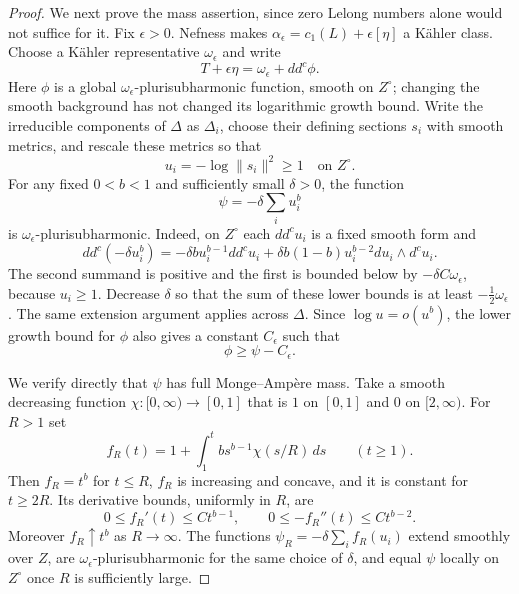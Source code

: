 \begin{proof}
We next prove the mass assertion, since zero Lelong numbers alone would
not suffice for it.  Fix $\epsilon>0$.  Nefness makes
$\alpha_\epsilon=c_1(L)+\epsilon[\eta]$ a Kähler class.  Choose a Kähler
representative $\omega_\epsilon$ and write
\[
 T+\epsilon\eta=\omega_\epsilon+dd^c\phi.
\]
Here $\phi$ is a global $\omega_\epsilon$-plurisubharmonic function,
smooth on $Z^\circ$; changing the smooth background has not changed its
logarithmic growth bound.  Write the irreducible components of $\Delta$
as $\Delta_i$, choose their defining sections $s_i$ with smooth metrics,
and rescale these metrics so that
\[
 u_i=-\log\|s_i\|^2\geq1\quad\text{on }Z^\circ.
\]
For any fixed $0<b<1$ and sufficiently small $\delta>0$, the function
\begin{equation}\label{eq:prelim-mass-barrier}
 \psi=-\delta\sum_i u_i^b
\end{equation}
is $\omega_\epsilon$-plurisubharmonic.  Indeed, on $Z^\circ$ each
$dd^c u_i$ is a fixed smooth form and
\[
 dd^c(-\delta u_i^b)
   =-\delta b u_i^{b-1}dd^c u_i
     +\delta b(1-b)u_i^{b-2}du_i\wedge d^c u_i.
\]
The second summand is positive and the first is bounded below by
$-\delta C\omega_\epsilon$, because $u_i\geq1$.  Decrease $\delta$ so
that the sum of these lower bounds is at least
$-\tfrac12\omega_\epsilon$.  The same extension argument applies across
$\Delta$.  Since $\log u=o(u^b)$, the lower growth bound for $\phi$
also gives a constant $C_\epsilon$ such that
\begin{equation}\label{eq:prelim-less-singular}
 \phi\geq\psi-C_\epsilon.
\end{equation}

We verify directly that $\psi$ has full Monge--Ampère mass.  Take a smooth
decreasing function $\chi:[0,\infty)\to[0,1]$ that is $1$ on $[0,1]$
and $0$ on $[2,\infty)$.  For $R>1$ set
\[
 f_R(t)=1+\int_1^t b s^{b-1}\chi(s/R)\,ds\qquad(t\geq1).
\]
Then $f_R=t^b$ for $t\leq R$, $f_R$ is increasing and concave, and it
is constant for $t\geq2R$.  Its derivative bounds, uniformly in $R$, are
\begin{equation}\label{eq:prelim-barrier-truncation}
 0\leq f_R'(t)\leq C t^{b-1},\qquad
 0\leq-f_R''(t)\leq C t^{b-2}.
\end{equation}
Moreover $f_R\uparrow t^b$ as $R\to\infty$.  The functions
$\psi_R=-\delta\sum_i f_R(u_i)$ extend smoothly over $Z$, are
$\omega_\epsilon$-plurisubharmonic for the same choice of $\delta$,
and equal $\psi$ locally on $Z^\circ$ once $R$ is sufficiently large.


\end{proof}
